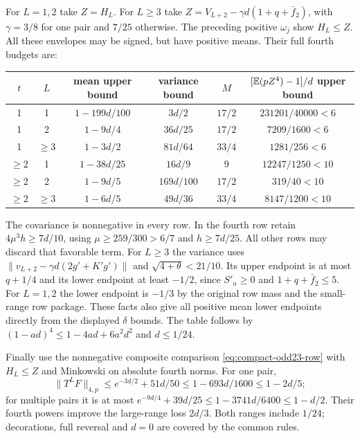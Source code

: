 For $L=1,2$ take $Z=H_L$. For $L\ge3$ take
$Z=V_{L+2}-\gamma d(1+q+\bar f_2)$, with
$\gamma=3/8$ for one pair and $7/25$ otherwise.
The preceding positive $\omega_j$ show $H_L\le Z$.
All these envelopes may be signed, but have positive means.
Their full fourth budgets are:
\begin{center}\small
\begin{tabular}{@{}cccccc@{}}
\toprule
$t$ & $L$ & mean upper bound & variance bound & $M$ & $[\mathbb E(pZ^4)-1]/d$ upper bound\\\midrule
1&1&$1-199d/100$&$3d/2$&$17/2$&$231201/40000<6$\\
1&2&$1-9d/4$&$36d/25$&$17/2$&$7209/1600<6$\\
1&$\ge3$&$1-3d/2$&$81d/64$&$33/4$&$1281/256<6$\\
$\ge2$&1&$1-38d/25$&$16d/9$&$9$&$12247/1250<10$\\
$\ge2$&2&$1-9d/5$&$169d/100$&$17/2$&$319/40<10$\\
$\ge2$&$\ge3$&$1-6d/5$&$49d/36$&$33/4$&$8147/1200<10$\\\bottomrule
\end{tabular}
\end{center}
The covariance is nonnegative in every row. In the fourth row retain
$4\mu^3h\ge7d/10$, using $\mu\ge259/300>6/7$ and $h\ge7d/25$.
All other rows may discard that favorable term.
For $L\ge3$ the variance uses
$\|v_{L+2}-\gamma d(2g'+K'g')\|$ and
$\sqrt{4+\theta}<21/10$.
Its upper endpoint is at most $q+1/4$ and its lower endpoint at least
$-1/2$, since $S'_n\ge0$ and $1+q+\bar f_2\le5$.
For $L=1,2$ the lower endpoint is $-1/3$ by the original row mass
and the small-range row package. These facts also give all positive
mean lower endpoints directly from the displayed $\delta$ bounds.
The table follows by $(1-ad)^4\le1-4ad+6a^2d^2$ and $d\le1/24$.

Finally use the nonnegative composite comparison
\eqref{eq:compact-odd23-row} with $H_L\le Z$ and Minkowski on
absolute fourth norms. For one pair,
\[
 \|T^LF\|_{4,p}\le e^{-3d/2}+51d/50
             \le1-693d/1600\le1-2d/5;
\]
for multiple pairs it is at most
$e^{-9d/4}+39d/25\le1-3741d/6400\le1-d/2$.
Their fourth powers improve the large-range loss $2d/3$.
Both ranges include $1/24$; decorations, full reversal and $d=0$
are covered by the common rules.
